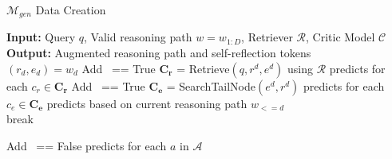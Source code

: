 \begin{algorithm*}
\caption{$\mathcal{M}_{gen}$ Data Creation}\label{algo:data_gen}
 {\bfseries Input: }{ Query $q$, Valid reasoning path $w=w_{1:D}$, Retriever $\mathcal{R}$, Critic Model $\mathcal{C}$}\\
  {\bfseries Output: }{Augmented reasoning path and self-reflection tokens}\\
 {$(r_d, e_d) = w_d$\;
 Add \rret~== True \;
 $\mathbf{C_r}$ = Retrieve$(q, r^d, e^d)$ using $\mathcal{R}$ 
\mcrt predicts \crel for each $c_r \in \mathbf{C_r}$   \; 
Add \eret~== True\;
 $\mathbf{C_e}$ = SearchTailNode$(e^d, r^d)$
\mcrt predicts \crel for each $c_e \in \mathbf{C_e}$\;
\mcrt predicts \cre based on current reasoning path $w_{<=d}$ \\
\uIf{\cre == \textcolor{myred}{\small{\texttt{[UnReasonable]}}}}
{break
}}

Add \rret~== False\;
\mcrt predicts \cuse for each $a$ in $\mathcal{A}$ \;

\end{algorithm*}